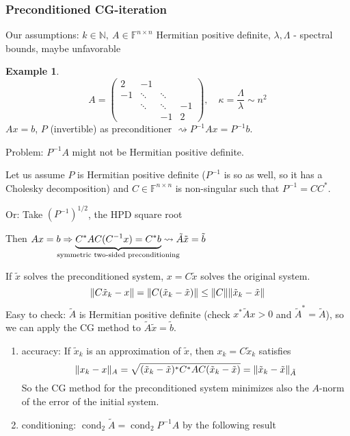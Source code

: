 \documentclass[12pt]{article}
\theoremstyle{definition}
\newtheorem*{example*}{Example}
\theoremstyle{remark}
\numberwithin{equation}{section}
\newcommand{\F}{\mathbb{F}}
\newcommand{\N}{\mathbb{N}}
\DeclarePairedDelimiter{\norm}{\lVert}{\rVert}
\DeclareMathOperator{\cond}{cond}
\begin{document}
\subsubsection*{Preconditioned CG-iteration}
Our assumptions: $k \in \N,\ A \in \F^{n\times n}$ Hermitian positive definite, $\lambda,\Lambda$ - spectral bounds, maybe unfavorable
\begin{example*}
  \begin{equation*}
    A =
    \begin{pmatrix}
      2  & -1 &&\\
      -1 & \ddots & \ddots & \\
      & \ddots & \ddots &-1 \\
      & & -1 & 2
    \end{pmatrix}
    ,\quad \kappa = \frac{\Lambda}{\lambda} \sim n^2
  \end{equation*}
  $Ax = b$, $P$ (invertible) as preconditioner $\rightsquigarrow P^{-1} A x = P^{-1} b$.

  Problem: $P^{-1} A$ might not be Hermitian positive definite.

  Let us assume $P$ is Hermitian positive definite ($P^{-1}$ is so as well, so it has a Cholesky decomposition) and $C \in \F^{n\times n}$ is non-singular such that $P^{-1} = CC^*$.

  Or: Take $(P^{-1})^{1/2}$, the HPD square root

  Then $Ax = b \Rightarrow \underbrace{C^* A C (C^{-1} x) = C^* b}_{\mathclap{\text{symmetric two-sided preconditioning}}} \rightsquigarrow \tilde{A} \tilde{x} = \tilde{b}$

  If $\tilde{x}$ solves the preconditioned system, $x = C \tilde{x}$ solves the original system.
  \begin{equation*}
    \norm{C \tilde{x}_k - x} = \norm{C(\tilde{x}_k - \tilde{x})} \leq \norm{C} \norm{\tilde{x}_k - \tilde{x}}
  \end{equation*}
  Easy to check: $\tilde{A}$ is Hermitian positive definite (check $x^*\tilde{A}x > 0$ and $\tilde{A}^* = \tilde{A}$), so we can apply the CG method to $\tilde{A} \tilde{x} = \tilde{b}$.
  \begin{enumerate}[label=(\roman*)]
    \item accuracy: If $\tilde{x}_k$ is an approximation of $\tilde{x}$, then $x_k = C \tilde{x}_k$ satisfies
      \begin{equation*}
        \norm{x_k - x}_A = \sqrt{(\tilde{x}_k - \tilde{x})^* C^* A C (\tilde{x}_k - \tilde{x})} = \norm{\tilde{x}_k - \tilde{x}}_{\tilde{A}}
      \end{equation*}
      So the CG method for the preconditioned system minimizes also the $A$-norm of the error of the initial system.
    \item conditioning: $\cond_2 \tilde{A} = \cond_2 P^{-1} A$ by the following result
  \end{enumerate}
\end{example*}
\end{document}
